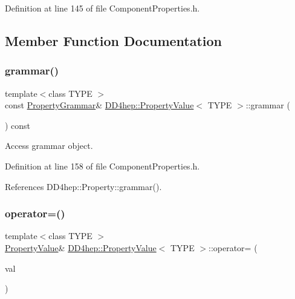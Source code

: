 Definition at line 145 of file Component\+Properties.\+h.



\subsection{Member Function Documentation}
\hypertarget{class_d_d4hep_1_1_property_value_abf0f660431b35fceb1e74b3f122d18d4}{}\label{class_d_d4hep_1_1_property_value_abf0f660431b35fceb1e74b3f122d18d4} 
\subsubsection{\texorpdfstring{grammar()}{grammar()}}
{\footnotesize\ttfamily template$<$class T\+Y\+PE $>$ \\
const \hyperlink{class_d_d4hep_1_1_property_grammar}{Property\+Grammar}\& \hyperlink{class_d_d4hep_1_1_property_value}{D\+D4hep\+::\+Property\+Value}$<$ T\+Y\+PE $>$\+::grammar (\begin{DoxyParamCaption}{ }\end{DoxyParamCaption}) const\hspace{0.3cm}{\ttfamily [inline]}}



Access grammar object. 



Definition at line 158 of file Component\+Properties.\+h.



References D\+D4hep\+::\+Property\+::grammar().

\hypertarget{class_d_d4hep_1_1_property_value_acb9f4997dbe446e56717ba1d58929303}{}\label{class_d_d4hep_1_1_property_value_acb9f4997dbe446e56717ba1d58929303} 
\subsubsection{\texorpdfstring{operator=()}{operator=()}}
{\footnotesize\ttfamily template$<$class T\+Y\+PE $>$ \\
\hyperlink{class_d_d4hep_1_1_property_value}{Property\+Value}\& \hyperlink{class_d_d4hep_1_1_property_value}{D\+D4hep\+::\+Property\+Value}$<$ T\+Y\+PE $>$\+::operator= (\begin{DoxyParamCaption}\item[{const T\+Y\+PE \&}]{val }\end{DoxyParamCaption})\hspace{0.3cm}{\ttfamily [inline]}}



